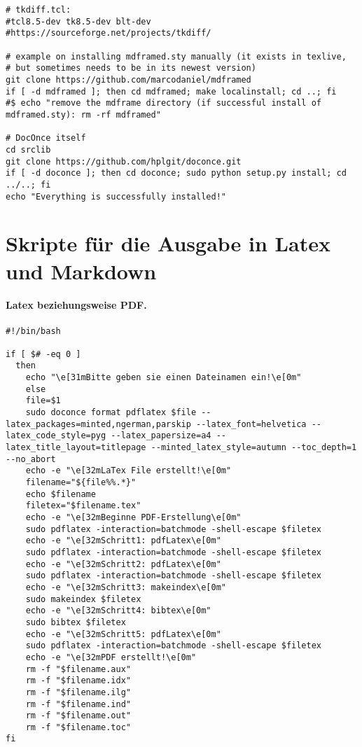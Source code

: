 \documentclass[%
oneside,                 %
final,                   %
chapterprefix=true,      %
open=right,              %
10pt]{book}
\begin{document}
\begin{verbatim}
# tkdiff.tcl:
#tcl8.5-dev tk8.5-dev blt-dev
#https://sourceforge.net/projects/tkdiff/

# example on installing mdframed.sty manually (it exists in texlive,
# but sometimes needs to be in its newest version)
git clone https://github.com/marcodaniel/mdframed
if [ -d mdframed ]; then cd mdframed; make localinstall; cd ..; fi
#$ echo "remove the mdframe directory (if successful install of mdframed.sty): rm -rf mdframed"

# DocOnce itself
cd srclib
git clone https://github.com/hplgit/doconce.git
if [ -d doconce ]; then cd doconce; sudo python setup.py install; cd ../..; fi
echo "Everything is successfully installed!"
\end{verbatim}
\section{Skripte für die Ausgabe in Latex und Markdown}
\paragraph{Latex beziehungsweise PDF.}

\begin{verbatim}
#!/bin/bash

if [ $# -eq 0 ]
  then
    echo "\e[31mBitte geben sie einen Dateinamen ein!\e[0m"
    else
    file=$1
    sudo doconce format pdflatex $file --latex_packages=minted,ngerman,parskip --latex_font=helvetica --latex_code_style=pyg --latex_papersize=a4 --latex_title_layout=titlepage --minted_latex_style=autumn --toc_depth=1 --no_abort
    echo -e "\e[32mLaTex File erstellt!\e[0m"
    filename="${file%%.*}"
    echo $filename
    filetex="$filename.tex"
    echo -e "\e[32mBeginne PDF-Erstellung\e[0m"
    sudo pdflatex -interaction=batchmode -shell-escape $filetex
    echo -e "\e[32mSchritt1: pdfLatex\e[0m"
    sudo pdflatex -interaction=batchmode -shell-escape $filetex
    echo -e "\e[32mSchritt2: pdfLatex\e[0m"
    sudo pdflatex -interaction=batchmode -shell-escape $filetex
    echo -e "\e[32mSchritt3: makeindex\e[0m"
    sudo makeindex $filetex
    echo -e "\e[32mSchritt4: bibtex\e[0m"
    sudo bibtex $filetex
    echo -e "\e[32mSchritt5: pdfLatex\e[0m"
    sudo pdflatex -interaction=batchmode -shell-escape $filetex
    echo -e "\e[32mPDF erstellt!\e[0m"
    rm -f "$filename.aux"
    rm -f "$filename.idx"
    rm -f "$filename.ilg"
    rm -f "$filename.ind"
    rm -f "$filename.out"
    rm -f "$filename.toc"
fi
\end{verbatim}
\end{document}
